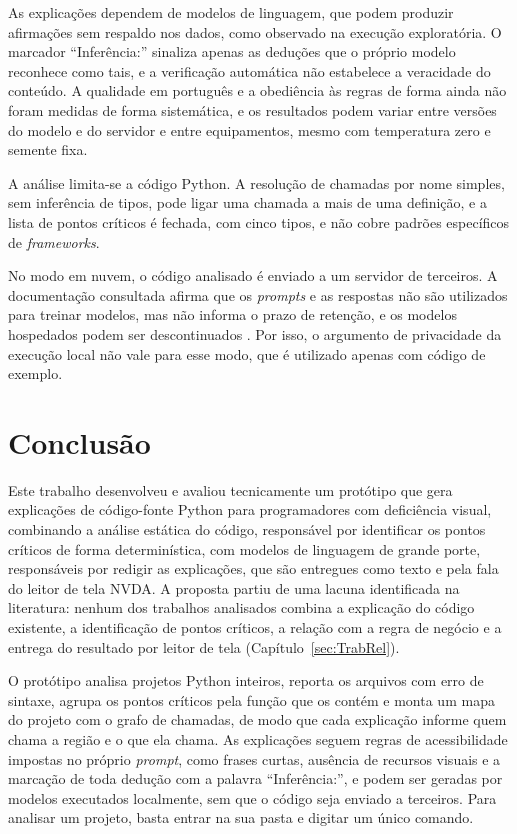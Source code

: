 \documentclass[
    12pt,                   %
    openright,              %
    oneside,                %
    a4paper,                %
    sumario=tradicional,    %
    english,                %
    brazil,                 %
    ]{abntex2}
\begin{document}
As explicações dependem de modelos de linguagem, que podem produzir afirmações sem respaldo nos dados, como observado na execução exploratória. O marcador \enquote{Inferência:} sinaliza apenas as deduções que o próprio modelo reconhece como tais, e a verificação automática não estabelece a veracidade do conteúdo. A qualidade em português e a obediência às regras de forma ainda não foram medidas de forma sistemática, e os resultados podem variar entre versões do modelo e do servidor e entre equipamentos, mesmo com temperatura zero e semente fixa.

A análise limita-se a código Python. A resolução de chamadas por nome simples, sem inferência de tipos, pode ligar uma chamada a mais de uma definição, e a lista de pontos críticos é fechada, com cinco tipos, e não cobre padrões específicos de \textit{frameworks}.

No modo em nuvem, o código analisado é enviado a um servidor de terceiros. A documentação consultada afirma que os \textit{prompts} e as respostas não são utilizados para treinar modelos, mas não informa o prazo de retenção, e os modelos hospedados podem ser descontinuados \cite{ollama2026nuvem}. Por isso, o argumento de privacidade da execução local não vale para esse modo, que é utilizado apenas com código de exemplo.


\chapter{Conclusão}\label{sec:conclusao}

Este trabalho desenvolveu e avaliou tecnicamente um protótipo que gera explicações de código-fonte Python para programadores com deficiência visual, combinando a análise estática do código, responsável por identificar os pontos críticos de forma determinística, com modelos de linguagem de grande porte, responsáveis por redigir as explicações, que são entregues como texto e pela fala do leitor de tela NVDA. A proposta partiu de uma lacuna identificada na literatura: nenhum dos trabalhos analisados combina a explicação do código existente, a identificação de pontos críticos, a relação com a regra de negócio e a entrega do resultado por leitor de tela (Capítulo~\ref{sec:TrabRel}).

O protótipo analisa projetos Python inteiros, reporta os arquivos com erro de sintaxe, agrupa os pontos críticos pela função que os contém e monta um mapa do projeto com o grafo de chamadas, de modo que cada explicação informe quem chama a região e o que ela chama. As explicações seguem regras de acessibilidade impostas no próprio \textit{prompt}, como frases curtas, ausência de recursos visuais e a marcação de toda dedução com a palavra \enquote{Inferência:}, e podem ser geradas por modelos executados localmente, sem que o código seja enviado a terceiros. Para analisar um projeto, basta entrar na sua pasta e digitar um único comando.
\end{document}
